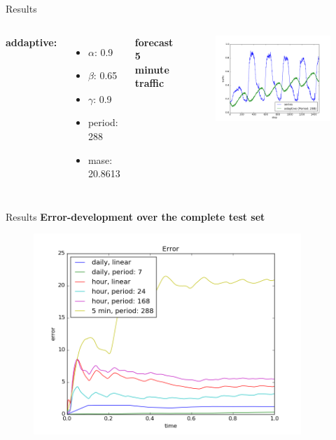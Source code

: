 \documentclass{beamer}
\begin{document}
  \begin{frame}{Results}
    \begin{columns}[c]
      \textbf{addaptive:}
      \begin{itemize}
	\item $\alpha$: 0.9 
	\item $\beta$: 0.65
	\item $\gamma$: 0.9
	\item period: 288
	\item mase: 20.8613
      \end{itemize}
    
      \textbf{forecast 5 minute traffic}
      \begin{figure}
	\includegraphics[width=1.1\textwidth]{images/5min.png}
      \end{figure}
    \end{columns}
  \end{frame}

   \begin{frame}{Results}
      \center \textbf{Error-development over the complete test set}
      \begin{figure}
	\includegraphics[width=0.9\textwidth]{images/error.png}
      \end{figure}
  \end{frame}
 
\end{document}

